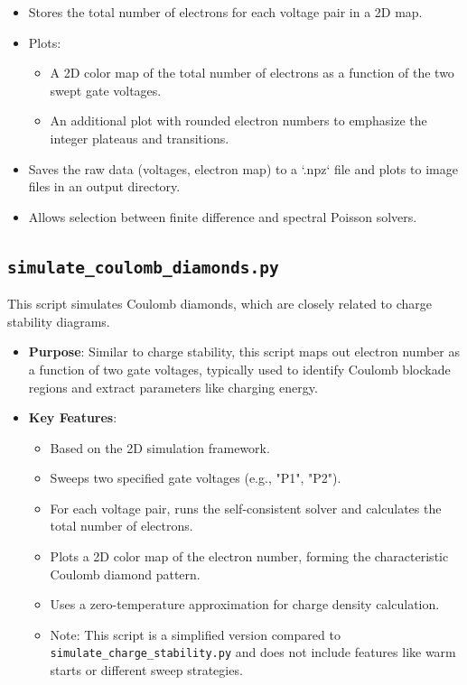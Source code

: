 \documentclass{article}
\begin{document}
\begin{itemize}
\begin{itemize}
		      \item Stores the total number of electrons for each voltage pair in a 2D map.
		      \item Plots:
		            \begin{itemize}
			            \item A 2D color map of the total number of electrons as a function of the two swept gate voltages.
			            \item An additional plot with rounded electron numbers to emphasize the integer plateaus and transitions.
		            \end{itemize}
		      \item Saves the raw data (voltages, electron map) to a `.npz` file and plots to image files in an output directory.
		      \item Allows selection between finite difference and spectral Poisson solvers.
	      \end{itemize}
\end{itemize}

\subsection{\texttt{simulate\_coulomb\_diamonds.py}}
This script simulates Coulomb diamonds, which are closely related to charge stability diagrams.
\begin{itemize}
	\item \textbf{Purpose}: Similar to charge stability, this script maps out electron number as a function of two gate voltages, typically used to identify Coulomb blockade regions and extract parameters like charging energy.
	\item \textbf{Key Features}:
	      \begin{itemize}
		      \item Based on the 2D simulation framework.
		      \item Sweeps two specified gate voltages (e.g., "P1", "P2").
		      \item For each voltage pair, runs the self-consistent solver and calculates the total number of electrons.
		      \item Plots a 2D color map of the electron number, forming the characteristic Coulomb diamond pattern.
		      \item Uses a zero-temperature approximation for charge density calculation.
		      \item Note: This script is a simplified version compared to \texttt{simulate\_charge\_stability.py} and does not include features like warm starts or different sweep strategies.
	      \end{itemize}
\end{itemize}
\end{document}
